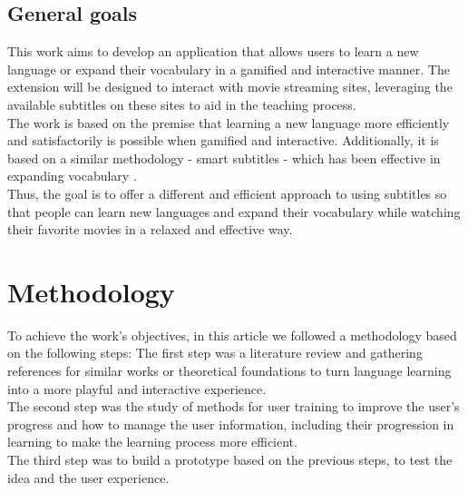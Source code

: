 \documentclass[12pt]{article}
\begin{document}
\subsection{General goals}

This work aims to develop an application that allows users to learn a new language or expand their vocabulary in a gamified and interactive manner. The extension will be designed to interact with movie streaming sites, leveraging the available subtitles on these sites to aid in the teaching process. \\
The work is based on the premise that learning a new language more efficiently and satisfactorily is possible when gamified and interactive. Additionally, it is based on a similar methodology - smart subtitles - which has been effective in expanding vocabulary \cite{Kovacs14}. \\
Thus, the goal is to offer a different and efficient approach to using subtitles so that people can learn new languages and expand their vocabulary while watching their favorite movies in a relaxed and effective way.



\section{Methodology}
To achieve the work's objectives, in this article we followed a methodology based on the following steps:
The first step was a literature review and gathering references for similar works or theoretical foundations to turn language learning into a more playful and interactive experience. \\
The second step was the study of methods for user training to improve the user's progress and how to manage the user information, including their progression in learning to make the learning process more efficient. \\
The third step was to build a prototype based on the previous steps, to test the idea and the user experience. \\
\end{document}
